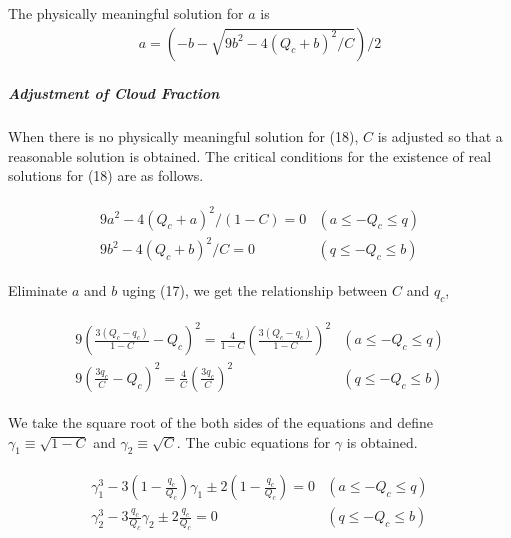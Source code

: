 The physically meaningful solution for \(a\) is \begin{eqnarray}
a=\left(-b-\sqrt{9 b^{2}-4\left(Q_{c}+b\right)^{2} / C}\right) / 2
\label{E08-18}
\end{eqnarray}

\hypertarget{adjustment-of-cloud-fraction}{%
\subparagraph{Adjustment of Cloud Fraction}\label{adjustment-of-cloud-fraction}}

When there is no physically meaningful solution for (18), \(C\) is adjusted so that a reasonable solution is obtained. The critical conditions for the existence of real solutions for (18) are as
follows.

\begin{eqnarray}
\begin{array}{ll}
9 a^{2}-4\left(Q_{c}+a\right)^{2} /(1-C)=0 & \left(a \leq-Q_{c} \leq q\right) \\
9 b^{2}-4\left(Q_{c}+b\right)^{2} / C=0 & \left(q \leq-Q_{c} \leq b\right)
\end{array}
\end{eqnarray}

Eliminate \(a\) and \(b\) uging (17), we get the relationship between \(C\) and \(q_c\),

\begin{eqnarray}
\begin{array}{ll}
9\left(\frac{3\left(Q_{c}-q_{c}\right)}{1-C}-Q_{c}\right)^{2}=\frac{4}{1-C}\left(\frac{3\left(Q_{c}-q_{c}\right)}{1-C}\right)^{2} & \left(a \leq-Q_{c} \leq q\right) \\
9\left(\frac{3 q_{c}}{C}-Q_{c}\right)^{2}=\frac{4}{C}\left(\frac{3 q_{c}}{C}\right)^{2} & \left(q \leq-Q_{c} \leq b\right)
\end{array}
\end{eqnarray}

We take the square root of the both sides of the equations and define \(\gamma_{1} \equiv\sqrt{1-C}\) and \(\gamma_{2} \equiv\sqrt{C}\). The cubic equations for \(\gamma\) is obtained.

\begin{eqnarray}
\begin{array}{ll}
\gamma_{1}^{3}-3\left(1-\frac{q_{c}}{Q_{c}}\right) \gamma_{1} \pm 2\left(1-\frac{q_{c}}{Q_{c}}\right)=0 & \left(a \leq-Q_{c} \leq q\right) \\
\gamma_{2}^{3}-3 \frac{q_{c}}{Q_{c}} \gamma_{2} \pm 2 \frac{q_{c}}{Q_{c}}=0 & \left(q \leq-Q_{c} \leq b\right)
\end{array}
\end{eqnarray}

